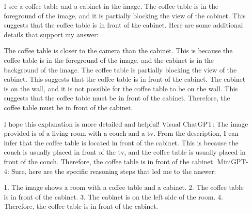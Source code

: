 \begin{enumerate}
    I see a coffee table and a cabinet in the image.
    The coffee table is in the foreground of the image, and it is partially blocking the view of the cabinet.
    This suggests that the coffee table is in front of the cabinet.
    Here are some additional details that support my answer:
    
    The coffee table is closer to the camera than the cabinet. This is because the coffee table is in the foreground of the image, and the cabinet is in the background of the image.
    The coffee table is partially blocking the view of the cabinet. This suggests that the coffee table is in front of the cabinet.
    The cabinet is on the wall, and it is not possible for the coffee table to be on the wall. This suggests that the coffee table must be in front of the cabinet.
    Therefore, the coffee table must be in front of the cabinet.
    
    I hope this explanation is more detailed and helpful! 
    \subitem Visual ChatGPT: The image provided is of a living room with a couch and a tv. From the description, I can infer that the coffee table is located in front of the cabinet. This is because the couch is usually placed in front of the tv, and the coffee table is usually placed in front of the couch. Therefore, the coffee table is in front of the cabinet.
    \subitem MiniGPT-4: Sure, here are the specific reasoning steps that led me to the answer:

    1. The image shows a room with a coffee table and a cabinet.
    2. The coffee table is in front of the cabinet.
    3. The cabinet is on the left side of the room.
    4. Therefore, the coffee table is in front of the cabinet.
\end{enumerate}
